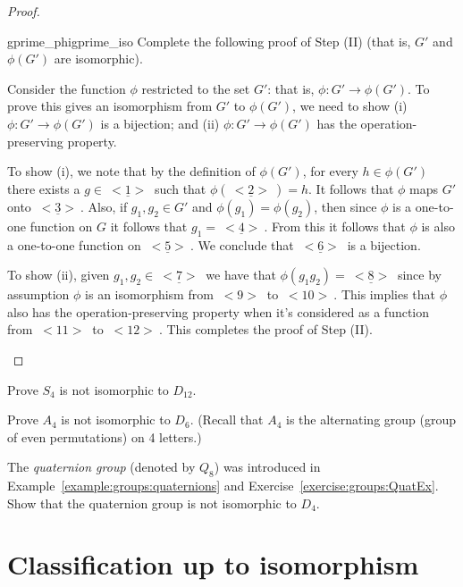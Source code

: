 \begin{proof}
\begin{exercise}{gprime_phigprime_iso}
Complete the following proof of Step (II) (that is, $G'$ and $\phi(G')$ are isomorphic). 
\medskip

Consider the function $\phi$ restricted to the set $G'$: that is, $\phi: G' \rightarrow \phi(G')$.  To  prove this gives an isomorphism from $G'$ to $\phi(G')$, we need to show (i) $\phi: G' \rightarrow \phi(G')$ is a bijection; and (ii) $\phi: G' \rightarrow \phi(G')$ has the operation-preserving property.

To show (i), we note that by the definition of $\phi(G')$, for every $h \in \phi(G')$ there exists a $g \in \underline{~<1>~}$ such that $\phi(\underline{~<2>~}) = h$. It follows that $\phi$ maps $G'$ onto $\underline{~<3>~}$.  Also, if $g_1, g_2 \in G'$ and $\phi(g_1) = \phi(g_2)$, then since $\phi$ is a one-to-one function on $G$ it follows that $g_1 = \underline{~<4>~}$. From this it follows that $\phi$ is also a one-to-one function on $\underline{~<5>~}$.  We conclude that $\underline{~<6>~}$ is a bijection.

To show (ii), given $g_1, g_2 \in \underline{~<7>~}$ we have that $\phi(g_1 g_2) = \underline{~<8>~}$ since by assumption $\phi$ is an isomorphism from \underline{$~<9>~$} to \underline{$~<10>~$}. This implies that $\phi$ also has the operation-preserving  property when it's considered as a function from  \underline{$~<11>~$} to \underline{$~<12>~$}.  This completes the proof of Step (II).
 \end{exercise}

\end{proof}

\begin{exercise}{}
Prove $S_4$ is not isomorphic to $D_{12}$. 
\end{exercise}

\begin{exercise}{}
Prove $A_4$ is not isomorphic to $D_{6}$. (Recall that $A_4$ is the alternating group (group of even permutations) on 4 letters.) 
\end{exercise}

\begin{exercise}{}
The \emph{quaternion group} (denoted by $Q_8$) was introduced in Example~\ref{example:groups:quaternions} and Exercise~\ref{exercise:groups:QuatEx}. Show that the quaternion group is not isomorphic to $D_4$.
\end{exercise}

\section{Classification up to isomorphism}
\label{sec:Isomorphism:Classification}

